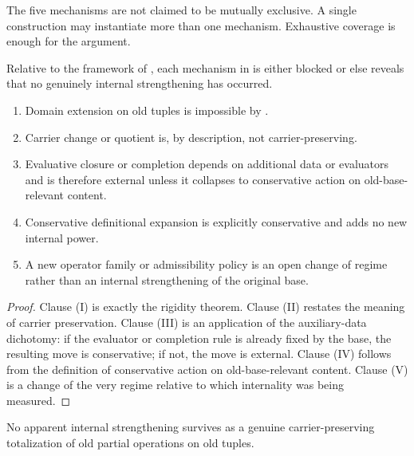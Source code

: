 \begin{remark}
The five mechanisms are not claimed to be mutually exclusive. A single construction may instantiate more than one mechanism. Exhaustive coverage is enough for the argument.
\end{remark}

\begin{proposition}\label{prop:five-disposition}
Relative to the framework of , each mechanism in  is either blocked or else reveals that no genuinely internal strengthening has occurred.
\begin{enumerate}[label=\textup{(\Roman*)}, leftmargin=3em]
    \item Domain extension on old tuples is impossible by .
    \item Carrier change or quotient is, by description, not carrier-preserving.
    \item Evaluative closure or completion depends on additional data or evaluators and is therefore external unless it collapses to conservative action on old-base-relevant content.
    \item Conservative definitional expansion is explicitly conservative and adds no new internal power.
    \item A new operator family or admissibility policy is an open change of regime rather than an internal strengthening of the original base.
\end{enumerate}
\end{proposition}

\begin{proof}
Clause (I) is exactly the rigidity theorem. Clause (II) restates the meaning of carrier preservation. Clause (III) is an application of the auxiliary-data dichotomy: if the evaluator or completion rule is already fixed by the base, the resulting move is conservative; if not, the move is external. Clause (IV) follows from the definition of conservative action on old-base-relevant content. Clause (V) is a change of the very regime relative to which internality was being measured.
\end{proof}

\begin{corollary}\label{cor:closure-totalization}
No apparent internal strengthening survives as a genuine carrier-preserving totalization of old partial operations on old tuples.
\end{corollary}

